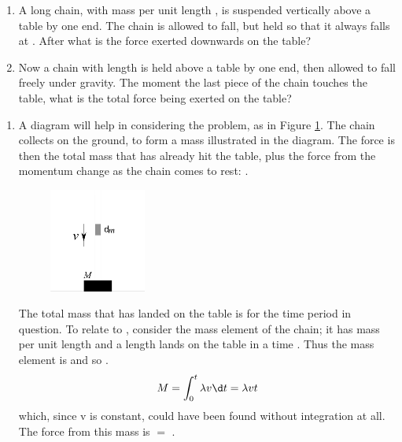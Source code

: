 
\begin{problem}[HE+_Chain] 
{\begin{enumerate}
\item A long chain, with mass per unit length , is suspended vertically above a table by one end. The chain is allowed to fall, but held so that it always falls at . After  what is the force exerted downwards on the table?
\item Now a chain with length  is held above a table by one end, then allowed to fall freely under gravity. The moment the last piece of the chain touches the table, what is the total force being exerted on the table?
\end{enumerate}
}
{}
{\begin{enumerate}
	\item A diagram will help in considering the problem, as in Figure \ref{fig:Dynamics_falling_chain_force}. The chain collects on the ground, to form a mass  illustrated in the diagram. The force is then the total mass that has already hit the table, plus the force from the momentum change as the chain comes to rest: .

\begin{figure}[h]
	\centering
	\includegraphics[width=0.3\textwidth]{../../../figures/Dynamics_falling_chain_force}
	\caption{}
	\label{fig:Dynamics_falling_chain_force}
\end{figure}

The total mass that has landed on the table is  for the time period in question. To relate  to , consider the mass element of the chain; it has mass per unit length \vari{\lambda} and a length  lands on the table in a time . Thus the mass element is  and so .
\begin{equation*} 
M = \int_{0}^{t}\lambda v \d t = \lambda v t
\end{equation*}
which, since v is constant, could have been found without integration at all. The force from this mass is  $=$ .


\end{enumerate}}
\end{problem}
